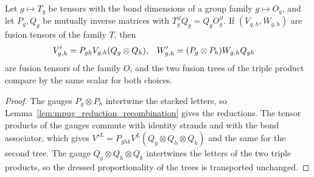 \begin{lemma}
    \label{lem:mpug_fusion_tensor_gauge_transport}
    \leanok
    Let $g\mapsto T_g$ be tensors with the bond dimensions of a group family
    $g\mapsto O_g$, and let $P_g,Q_g$ be mutually inverse matrices with
    $T_g^{il}Q_g=Q_gO_g^{il}$. If $(V_{g,h},W_{g,h})$ are fusion tensors of
    the family $T$, then
    \begin{align}
        V'_{g,h} & =P_{gh}V_{g,h}(Q_g\otimes Q_h), &
        W'_{g,h} & =(P_g\otimes P_h)W_{g,h}Q_{gh}
        \notag
    \end{align}
    are fusion tensors of the family $O$, and the two fusion trees of the
    triple product compare by the same scalar for both choices.
\end{lemma}

\begin{proof}
    \leanok
    The gauges $P_g\otimes P_h$ intertwine the stacked letters, so
    Lemma~\ref{lem:mpug_reduction_recombination} gives the reductions. The
    tensor products of the gauges commute with identity strands and with the
    bond associator, which gives
    $V'^L=P_{ghk}V^L(Q_g\otimes Q_h\otimes Q_k)$ and the same for the second
    tree. The gauge $Q_g\otimes Q_h\otimes Q_k$ intertwines the letters of
    the two triple products, so the dressed proportionality of the trees
    is transported unchanged.
\end{proof}

